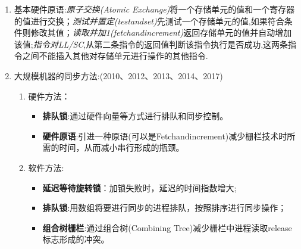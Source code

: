 \documentclass[a4paper]{ctexart}
\newcommand{\li}{\uline{\hspace{0.5em}}}
\begin{document}
\begin{enumerate}
  \item 基本硬件原语:\emph{原子交换(Atomic Exchange)}将一个存储单元的值和一个寄存器的值进行交换；\emph{测试并置定(test\li and\li set)}先测试一个存储单元的值,如果符合条件则修改其值；\emph{读取并加1(fetch\li and\li increment)}返回存储单元的值并自动增加该值;\emph{指令对LL/SC},从第二条指令的返回值判断该指令执行是否成功,这两条指令之间不能插入其他对存储单元进行操作的其他指令.
  \item 大规模机器的同步方法:(2010、2012、2013、2014、2017)
  \begin{enumerate}
    \item 硬件方法：
    \begin{itemize}
      \item \textbf{排队锁}:通过硬件向量等方式进行排队和同步控制。
      \item \textbf{硬件原语}:引进一种原语(可以是Fetch\li and\li increment)减少栅栏技术时所需的时间，从而减小串行形成的瓶颈。
    \end{itemize}
    \item 软件方法:
    \begin{itemize}
      \item \textbf{延迟等待旋转锁}：加锁失败时，延迟的时间指数增大;
      \item \textbf{排队锁}:用数组将要进行同步的进程排队，按照排序进行同步操作；
      \item \textbf{组合树栅栏}:通过组合树(Combining Tree)减少栅栏中进程读取release标志形成的冲突。
    \end{itemize}
  \end{enumerate}
\end{enumerate}
\end{document}

